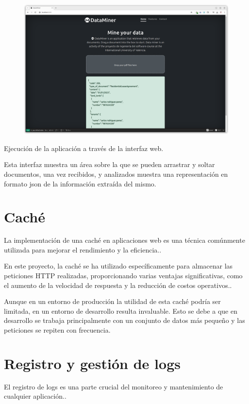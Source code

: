 \begin{figure}
    \centering
    \includegraphics{./chapter/4/images/ad_4nxc3kwvjbdgjf8jxg_-9pf51kwcykrlcqlvr_28ejlb2jbbztkj9huiri-dti7x79w8xg3u_md1fyt0-q_gnmefljxbffub8}
    \caption{}
    \label{fig:ad_4nxc3kwvjbdgjf8jxg_-9pf51kwcykrlcqlvr_28ejlb2jbbztkj9huiri-dti7x79w8xg3u_md1fyt0-q_gnmefljxbffub8}
\end{figure}

Ejecución de la aplicación a través de la interfaz web.

Esta interfaz muestra un área sobre la que se pueden arrastrar y soltar documentos, una vez recibidos, y analizados muestra una representación en formato json de la información extraída del mismo.

\section*{Caché}
La implementación de una caché en aplicaciones web es una técnica comúnmente utilizada para mejorar el rendimiento y la eficiencia..

En este proyecto, la caché se ha utilizado específicamente para almacenar las peticiones HTTP realizadas, proporcionando varias ventajas significativas, como el aumento de la velocidad de respuesta y la reducción de costos operativos..

Aunque en un entorno de producción la utilidad de esta caché podría ser limitada, en un entorno de desarrollo resulta invaluable. Esto se debe a que en desarrollo se trabaja principalmente con un conjunto de datos más pequeño y las peticiones se repiten con frecuencia.

\section*{Registro y gestión de logs}
El registro de logs es una parte crucial del monitoreo y mantenimiento de cualquier aplicación..

